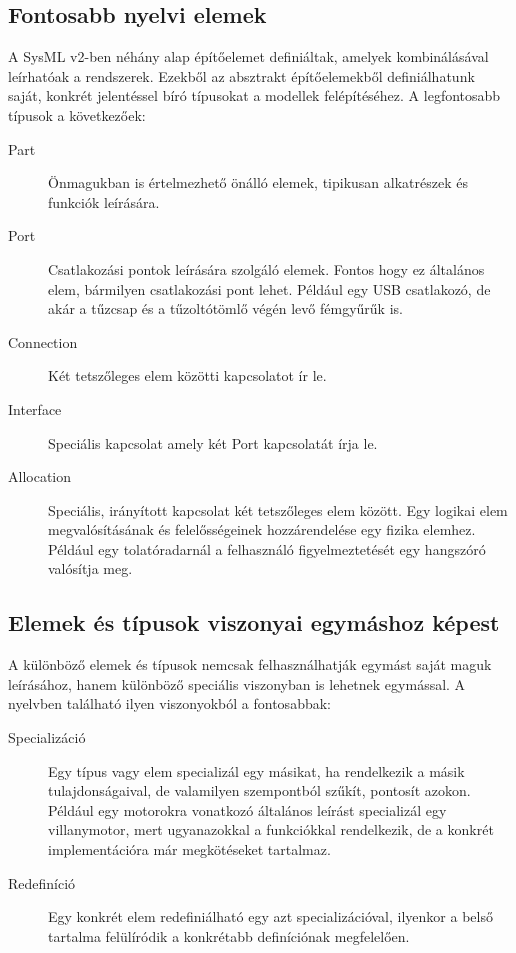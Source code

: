     \subsection{Fontosabb nyelvi elemek} \label{sec:NyelviElemek}
    A SysML v2-ben néhány alap építőelemet definiáltak, amelyek kombinálásával leírhatóak a rendszerek. Ezekből az absztrakt építőelemekből definiálhatunk saját, konkrét jelentéssel bíró típusokat a modellek felépítéséhez. A legfontosabb típusok a következőek:
    \begin{description}
        \item[Part] Önmagukban is értelmezhető önálló elemek, tipikusan alkatrészek és funkciók leírására.
        \item[Port] Csatlakozási pontok leírására szolgáló elemek. Fontos hogy ez általános elem, bármilyen csatlakozási pont lehet. Például egy USB csatlakozó, de akár a tűzcsap és a tűzoltótömlő végén levő fémgyűrűk is.
        \item[Connection] Két tetszőleges elem közötti kapcsolatot ír le.
        \item[Interface] Speciális kapcsolat amely két Port kapcsolatát írja le.
        \item[Allocation] Speciális, irányított kapcsolat két tetszőleges elem között. Egy logikai elem megvalósításának és felelősségeinek hozzárendelése egy fizika elemhez. Például egy tolatóradarnál a felhasználó figyelmeztetését egy hangszóró valósítja meg.
    \end{description}

    \subsection{Elemek és típusok viszonyai egymáshoz képest}
    A különböző elemek és típusok nemcsak felhasználhatják egymást saját maguk leírásához, hanem különböző speciális viszonyban is lehetnek egymással.
    A nyelvben található ilyen viszonyokból a fontosabbak:
    \begin{description}
        \item[Specializáció] Egy típus vagy elem specializál egy másikat, ha rendelkezik a másik tulajdonságaival, de valamilyen szempontból szűkít, pontosít azokon. Például egy motorokra vonatkozó általános leírást specializál egy villanymotor, mert ugyanazokkal a funkciókkal rendelkezik, de a konkrét implementációra már megkötéseket tartalmaz.
        \item[Redefiníció] Egy konkrét elem redefiniálható egy azt specializációval, ilyenkor a belső tartalma felülíródik a konkrétabb definíciónak megfelelően.
    \end{description}

